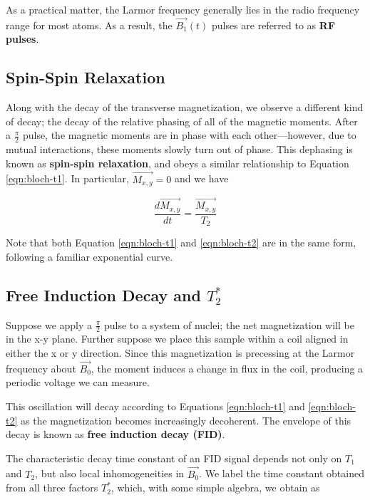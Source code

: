 \documentclass[
    floatfix,  %
    reprint,
    amsmath,amssymb,
    aps,
]{revtex4-2}
\newcommand{\halfpi}{\frac{\pi}{2}}
\begin{document}
As a practical matter, the Larmor frequency generally lies in the radio frequency range for most atoms. As a result, the $\vec{B_1}(t)$ pulses are referred to as \textbf{RF pulses}.


\subsection{\label{sec:t2} Spin-Spin Relaxation}

Along with the decay of the transverse magnetization, we observe a different kind of decay; the decay of the relative phasing of all of the magnetic moments. After a $\halfpi$ pulse, the magnetic moments are in phase with each other---however, due to mutual interactions, these moments slowly turn out of phase. This dephasing is known as \textbf{spin-spin relaxation}, and obeys a similar relationship to Equation \ref{eqn:bloch-t1}. In particular, $\vec{M_{x,y}}= 0$ and we have

\begin{equation}\label{eqn:bloch-t2}
    \frac{d\vec{M_{x,y}}}{dt} = \frac{\vec{M_{x,y}}}{T_2}
\end{equation}

Note that both Equation \ref{eqn:bloch-t1} and \ref{eqn:bloch-t2} are in the same form, following a familiar exponential curve.


\subsection{Free Induction Decay and $T_2^*$}

Suppose we apply a $\halfpi$ pulse to a system of nuclei; the net magnetization will be in the x-y plane. Further suppose we place this sample within a coil aligned in either the x or y direction. Since this magnetization is precessing at the Larmor frequency about \(\vec{B_0}\), the moment induces a change in flux in the coil, producing a periodic voltage we can measure.

This oscillation will decay according to Equations \ref{eqn:bloch-t1} and \ref{eqn:bloch-t2} as the magnetization becomes increasingly decoherent. The envelope of this decay is known as \textbf{free induction decay (FID)}.

The characteristic decay time constant of an FID signal depends not only on $T_1$ and $T_2$, but also local inhomogeneities in $\vec{B_0}$. We label the time constant obtained from all three factors $T_2^*$, which, with some simple algebra, we obtain as \cite{lab-manual}
\end{document}
